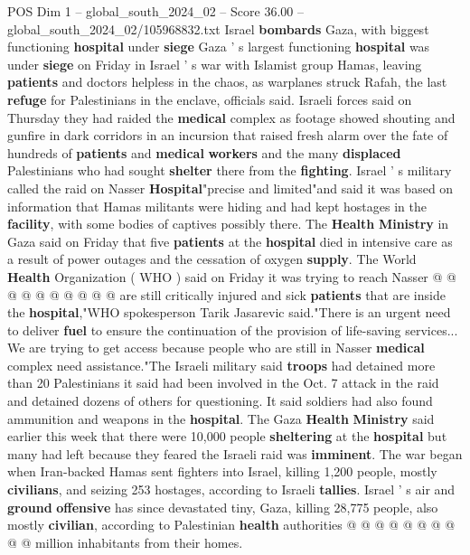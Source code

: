 \begin{textsample}{POS Dim 1 – global\_south\_2024\_02 – Score 36.00 – global\_south\_2024\_02/105968832.txt}  \label{ex:f1_pos_022}
Israel \textbf{bombards} Gaza, with biggest functioning \textbf{hospital} under \textbf{siege} Gaza ' s largest functioning \textbf{hospital} was under \textbf{siege} on Friday in Israel ' s war with Islamist group Hamas, leaving \textbf{patients} and doctors helpless in the chaos, as warplanes struck Rafah, the last \textbf{refuge} for Palestinians in the enclave, officials said.
Israeli forces said on Thursday they had raided the \textbf{medical} complex as footage showed shouting and gunfire in dark corridors in an incursion that raised fresh alarm over the fate of hundreds of \textbf{patients} and \textbf{medical} \textbf{workers} and the many \textbf{displaced} Palestinians who had sought \textbf{shelter} there from the \textbf{fighting}.
Israel ' s military called the raid on Nasser \textbf{Hospital}"precise and limited"and said it was based on information that Hamas militants were hiding and had kept hostages in the \textbf{facility}, with some bodies of captives possibly there.
The \textbf{Health} \textbf{Ministry} in Gaza said on Friday that five \textbf{patients} at the \textbf{hospital} died in intensive care as a result of power outages and the cessation of oxygen \textbf{supply}.
The World \textbf{Health} Organization ( WHO ) said on Friday it was trying to reach Nasser @ @ @ @ @ @ @ @ @ @ are still critically injured and sick \textbf{patients} that are inside the \textbf{hospital},"WHO spokesperson Tarik Jasarevic said."There is an urgent need to deliver \textbf{fuel} to ensure the continuation of the provision of life-saving services...
We are trying to get access because people who are still in Nasser \textbf{medical} complex need assistance."The Israeli military said \textbf{troops} had detained more than 20 Palestinians it said had been involved in the Oct. 7 attack in the raid and detained dozens of others for questioning.
It said soldiers had also found ammunition and weapons in the \textbf{hospital}.
The Gaza \textbf{Health} \textbf{Ministry} said earlier this week that there were 10,000 people \textbf{sheltering} at the \textbf{hospital} but many had left because they feared the Israeli raid was \textbf{imminent}.
The war began when Iran-backed Hamas sent fighters into Israel, killing 1,200 people, mostly \textbf{civilians}, and seizing 253 hostages, according to Israeli \textbf{tallies}.
Israel ' s air and \textbf{ground} \textbf{offensive} has since devastated tiny, Gaza, killing 28,775 people, also mostly \textbf{civilian}, according to Palestinian \textbf{health} authorities @ @ @ @ @ @ @ @ @ @ million inhabitants from their homes.

\end{textsample}
